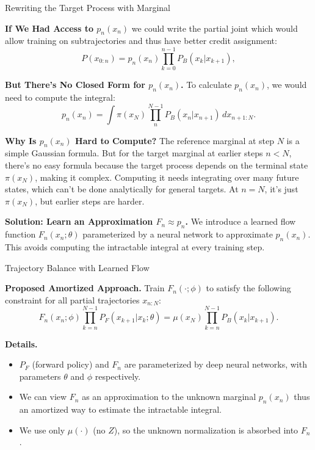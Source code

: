 \documentclass[aspectratio=169,xcolor=dvipsnames]{beamer}
\begin{document}
\begin{frame}[t]{Rewriting the Target Process with Marginal}
\scriptsize

\textbf{If We Had Access to $p_n(x_n)$} we could write the partial joint which would allow training on subtrajectories and thus have better credit assignment:
\[
P(x_{0:n}) = p_n(x_n) \prod_{k=0}^{n-1} P_B(x_k | x_{k+1}),
\]

\textbf{But There's No Closed Form for $p_n(x_n)$.} To calculate $p_n(x_n)$, we would need to compute the integral:
\[
p_n(x_n) = \int \pi(x_N) \prod_{n}^{N-1} P_B(x_n | x_{n+1}) \, dx_{n+1:N}.
\]

\textbf{Why Is $p_n(x_n)$ Hard to Compute?} The reference marginal at step $N$ is a simple Gaussian formula. But for the target marginal at earlier steps $n < N$, there's no easy formula because the target process depends on the terminal state $\pi(x_N)$, making it complex. Computing it needs integrating over many future states, which can't be done analytically for general targets. At $n = N$, it's just $\pi(x_N)$, but earlier steps are harder.


\textbf{Solution: Learn an Approximation $F_n \approx p_n$.} We introduce a learned flow function $F_n(x_n; \theta)$ parameterized by a neural network to approximate $p_n(x_n)$. This avoids computing the intractable integral at every training step.


\end{frame}

\begin{frame}[t]{Trajectory Balance with Learned Flow}
\footnotesize

\textbf{Proposed Amortized Approach.} Train $F_n(\cdot; \phi)$ to satisfy the following constraint for all partial trajectories $x_{n:N}$:
\[
F_n(x_n; \phi) \prod_{k=n}^{N-1} P_F(x_{k+1} | x_k; \theta) = \mu(x_N) \prod_{k=n}^{N-1} P_B(x_k | x_{k+1}).
\]

\textbf{Details.}
\begin{itemize}\itemsep2pt
  \item $P_F$ (forward policy) and $F_n$ are parameterized by deep neural networks, with parameters $\theta$ and $\phi$ respectively.
  \item We can view $F_n$ as an approximation to the unknown marginal $p_n(x_n)$ thus an amortized way to estimate the intractable integral.
  \item We use only $\mu(\cdot)$ (no $Z$), so the unknown normalization is absorbed into $F_n$.
\end{itemize}
\end{frame}
\end{document}

